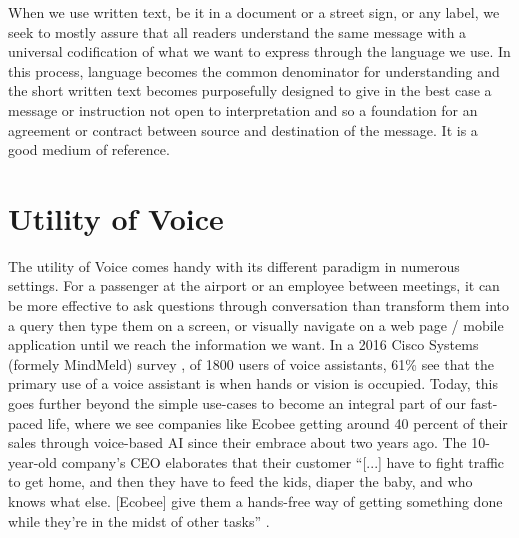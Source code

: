 
When we use written text, be it in a document or a street sign, or any label, we seek to mostly assure that all %
readers understand the same message with a universal codification of what we want to express through the language we use. In this process, language becomes the common denominator for understanding and the short written text becomes purposefully designed to give in the best case a message or instruction not open to interpretation and so a foundation for an agreement or contract between %
source and 
destination of the message. It is a good medium of reference. 

\section{Utility of Voice}
The utility of Voice comes handy with its different paradigm in numerous settings. 
For a passenger at the airport or an employee between meetings, 
it can be more effective to ask questions through conversation than transform them into a query then type them on a screen,
or visually navigate on a web page / mobile application until we reach the information we want. In a 2016 Cisco Systems (formely MindMeld) survey \cite{mindmeldReport}, of 1800 users of voice assistants, 61\% see that the primary use of a voice assistant is when hands or vision is occupied.
Today, this goes further beyond the simple use-cases to become an integral part of our fast-paced life, where we see companies like Ecobee getting around 40 percent of their sales through voice-based AI \cite{mit:Alexa} since their embrace about two years ago. The 10-year-old company's CEO elaborates that their customer “[...] have to fight traffic to get home, and then they have to feed the kids, diaper the baby, and who knows what else. [Ecobee] give them a hands-free way of getting something done while they’re in the midst of other tasks” \cite{mit:Alexa} .


